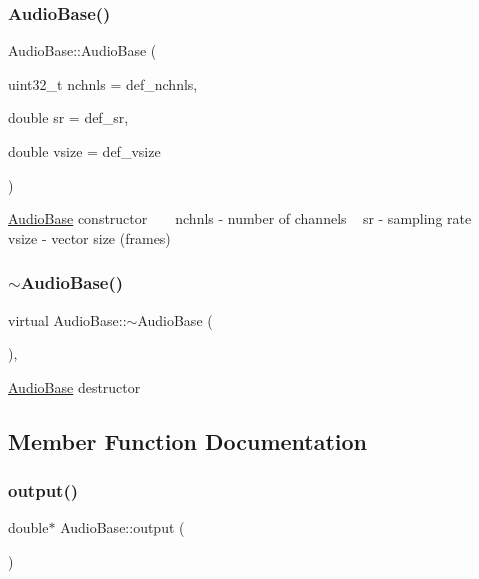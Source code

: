 \subsubsection{\texorpdfstring{Audio\+Base()}{AudioBase()}}
{\footnotesize\ttfamily Audio\+Base\+::\+Audio\+Base (\begin{DoxyParamCaption}\item[{uint32\+\_\+t}]{nchnls = {\ttfamily def\+\_\+nchnls},  }\item[{double}]{sr = {\ttfamily def\+\_\+sr},  }\item[{double}]{vsize = {\ttfamily def\+\_\+vsize} }\end{DoxyParamCaption})\hspace{0.3cm}{\ttfamily [inline]}}

\hyperlink{class_audio_base}{Audio\+Base} constructor ~\newline
~\newline
nchnls -\/ number of channels ~\newline
sr -\/ sampling rate ~\newline
vsize -\/ vector size (frames) ~\newline
\mbox{\label{class_audio_base_a6517030ff62530ae78c7fa63a9512c6d}} 
\subsubsection{\texorpdfstring{$\sim$\+Audio\+Base()}{~AudioBase()}}
{\footnotesize\ttfamily virtual Audio\+Base\+::$\sim$\+Audio\+Base (\begin{DoxyParamCaption}{ }\end{DoxyParamCaption})\hspace{0.3cm}{\ttfamily [inline]}, {\ttfamily [virtual]}}

\hyperlink{class_audio_base}{Audio\+Base} destructor 

\subsection{Member Function Documentation}
\mbox{\label{class_audio_base_adcdfe60eebbc745101dd0437874ec237}} 
\subsubsection{\texorpdfstring{output()}{output()}\hspace{0.1cm}{\footnotesize\ttfamily [1/2]}}
{\footnotesize\ttfamily double$\ast$ Audio\+Base\+::output (\begin{DoxyParamCaption}{ }\end{DoxyParamCaption})\hspace{0.3cm}{\ttfamily [inline]}}

